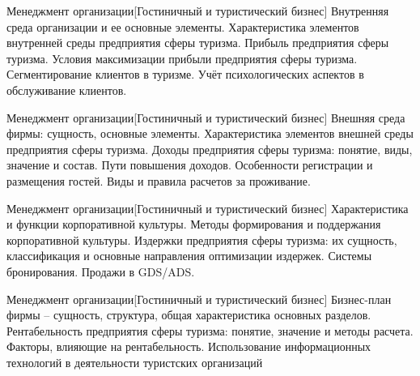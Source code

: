\documentclass[
	11pt,
	a4paper,
	]
	{article}
\begin{document}
\vfill



\begin{minipage}[t][\miniH]{\miniL}\centering
	 {Менеджмент организации}[Гостиничный и туристический бизнес]
		{
			Внутренняя среда организации и ее основные элементы. Характеристика элементов внутренней среды предприятия сферы туризма.
		}{
			Прибыль предприятия сферы туризма. Условия максимизации прибыли предприятия сферы туризма.
		}{
			Сегментирование клиентов в туризме. Учёт психологических аспектов в обслуживание клиентов.
		}
	\lowGE
\end{minipage}

\vfill



\begin{minipage}[t][\miniH]{\miniL}\centering
	 {Менеджмент организации}[Гостиничный и туристический бизнес]
		{
			Внешняя среда фирмы: сущность, основные элементы. Характеристика элементов внешней среды предприятия сферы туризма.
		}{
			Доходы предприятия сферы туризма: понятие, виды, значение и состав. Пути повышения доходов.
		}{
			Особенности регистрации и размещения гостей. Виды и правила расчетов за проживание.
		}
	\lowGE
\end{minipage}





\begin{minipage}[t][\miniH]{\miniL}\centering
	 {Менеджмент организации}[Гостиничный и туристический бизнес]
		{
			Характеристика и функции корпоративной культуры. Методы формирования и поддержания корпоративной культуры.
		}{
			Издержки предприятия сферы туризма: их сущность, классификация и основные направления оптимизации издержек.
		}{
			Системы бронирования. Продажи в GDS/ADS.
		}
	\lowGE
\end{minipage}

\vfill



\begin{minipage}[t][\miniH]{\miniL}\centering
	 {Менеджмент организации}[Гостиничный и туристический бизнес]
		{
			Бизнес-план фирмы – сущность, структура, общая характеристика основных разделов.
		}{
			Рентабельность предприятия сферы туризма: понятие, значение и методы расчета. Факторы, влияющие на рентабельность.
		}{
			Использование информационных технологий в деятельности туристских организаций
		}
	\lowGE
\end{minipage}
\end{document}
